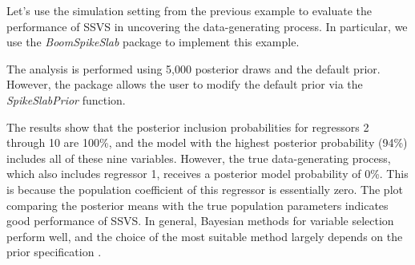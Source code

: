 Let's use the simulation setting from the previous example to evaluate the performance of SSVS in uncovering the data-generating process. In particular, we use the \textit{BoomSpikeSlab} package to implement this example.

The analysis is performed using 5,000 posterior draws and the default prior. However, the package allows the user to modify the default prior via the \textit{SpikeSlabPrior} function.

The results show that the posterior inclusion probabilities for regressors 2 through 10 are 100\%, and the model with the highest posterior probability (94\%) includes all of these nine variables. However, the true data-generating process, which also includes regressor 1, receives a posterior model probability of 0\%. This is because the population coefficient of this regressor is essentially zero. The plot comparing the posterior means with the true population parameters indicates good performance of SSVS. In general, Bayesian methods for variable selection perform well, and the choice of the most suitable method largely depends on the prior specification \cite{ohara2009bayesian}.

